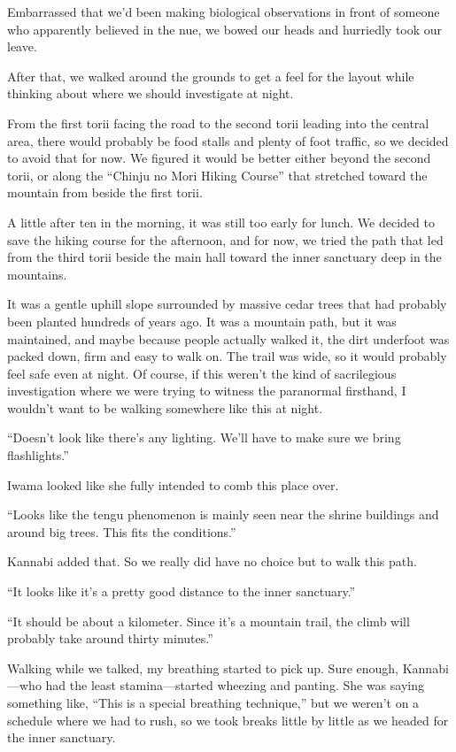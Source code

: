 \documentclass[
    a4paper,
    12pt,
    twoside,
    openany,
    UTF8,
    fontset=windows
]{ctexbook}
\begin{document}
Embarrassed that we'd been making biological observations in front of someone who apparently believed in the nue, we bowed our heads and hurriedly took our leave.

After that, we walked around the grounds to get a feel for the layout while thinking about where we should investigate at night.

From the first torii facing the road to the second torii leading into the central area, there would probably be food stalls and plenty of foot traffic, so we decided to avoid that for now. We figured it would be better either beyond the second torii, or along the ``Chinju no Mori Hiking Course'' that stretched toward the mountain from beside the first torii.

A little after ten in the morning, it was still too early for lunch. We decided to save the hiking course for the afternoon, and for now, we tried the path that led from the third torii beside the main hall toward the inner sanctuary deep in the mountains.

It was a gentle uphill slope surrounded by massive cedar trees that had probably been planted hundreds of years ago. It was a mountain path, but it was maintained, and maybe because people actually walked it, the dirt underfoot was packed down, firm and easy to walk on. The trail was wide, so it would probably feel safe even at night. Of course, if this weren't the kind of sacrilegious investigation where we were trying to witness the paranormal firsthand, I wouldn't want to be walking somewhere like this at night.

``Doesn't look like there's any lighting. We'll have to make sure we bring flashlights.''

Iwama looked like she fully intended to comb this place over.

``Looks like the tengu phenomenon is mainly seen near the shrine buildings and around big trees. This fits the conditions.''

Kannabi added that. So we really did have no choice but to walk this path.

``It looks like it's a pretty good distance to the inner sanctuary.''

``It should be about a kilometer. Since it's a mountain trail, the climb will probably take around thirty minutes.''

Walking while we talked, my breathing started to pick up. Sure enough, Kannabi---who had the least stamina---started wheezing and panting. She was saying something like, ``This is a special breathing technique,'' but we weren't on a schedule where we had to rush, so we took breaks little by little as we headed for the inner sanctuary.
\end{document}
